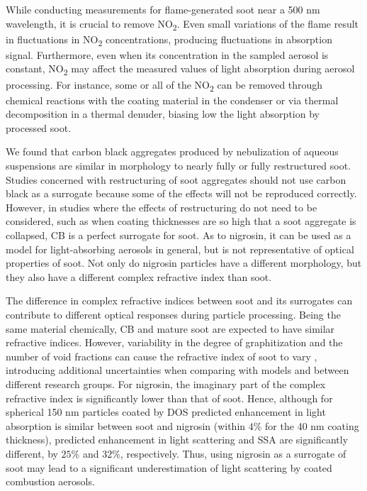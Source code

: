 \documentclass[12pt,authoryear]{elsarticle}
\begin{document}
While conducting measurements for flame-generated soot near a 500 nm wavelength, it is crucial to remove NO\textsubscript{2}. Even small variations of the flame result in fluctuations in NO\textsubscript{2} concentrations, producing fluctuations in absorption signal. Furthermore, even when its concentration in the sampled aerosol is constant, NO\textsubscript{2} may affect the measured values of light absorption during aerosol processing. For instance, some or all of the NO\textsubscript{2} can be removed through chemical reactions with the coating material in the condenser or via thermal decomposition in a thermal denuder, biasing low the light absorption by processed soot.

We found that carbon black aggregates produced by nebulization of aqueous suspensions are similar in morphology to nearly fully or fully restructured soot. Studies concerned with restructuring of soot aggregates should not use carbon black as a surrogate because some of the effects will not be reproduced correctly. However, in studies where the effects of restructuring do not need to be considered, such as when coating thicknesses are so high that a soot aggregate is collapsed, CB is a perfect surrogate for soot. As to nigrosin, it can be used as a model for light-absorbing aerosols in general, but is not representative of optical properties of soot. Not only do nigrosin particles have a different morphology, but they also have a different complex refractive index than soot.

The difference in complex refractive indices between soot and its surrogates can contribute to different optical responses during particle processing. Being the same material chemically, CB and mature soot are expected to have similar refractive indices. However, variability in the degree of graphitization and the number of void fractions can cause the refractive index of soot to vary \citep{RN72}, introducing additional uncertainties when comparing with models and between different research groups. For nigrosin, the imaginary part of the complex refractive index is significantly lower than that of soot. Hence, although for spherical 150 nm particles coated by DOS predicted enhancement in light absorption is similar between soot and nigrosin (within $4\%$ for the 40 nm coating thickness), predicted enhancement in light scattering and SSA are significantly different, by $25\%$ and $32\%$, respectively. Thus, using nigrosin as a surrogate of soot may lead to a significant underestimation of light scattering by coated combustion aerosols. 
\end{document}
